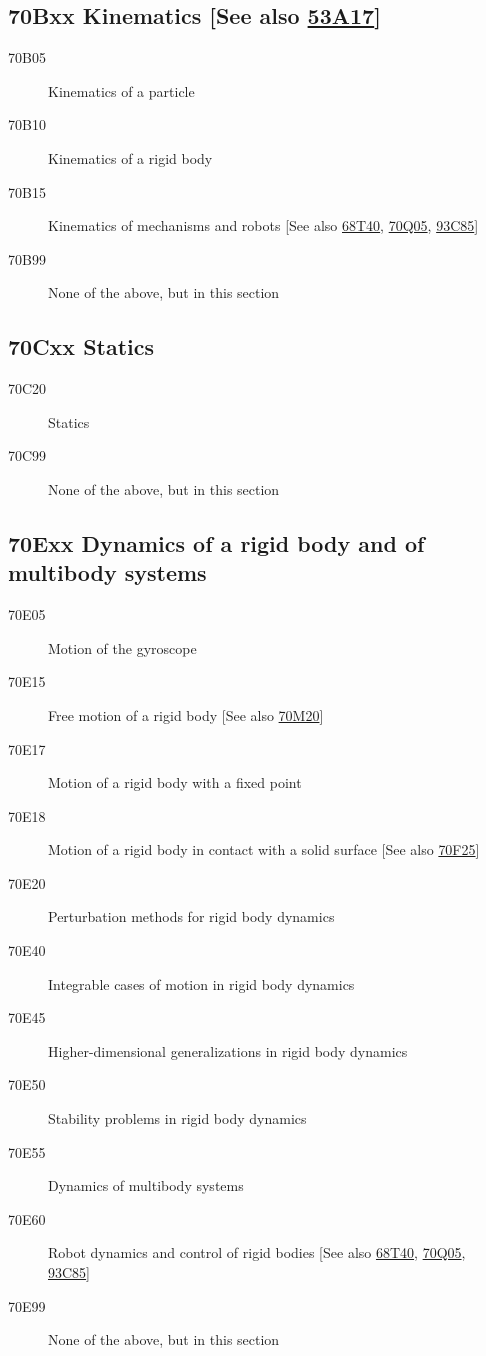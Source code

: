 \documentclass[letterpaper]{article}
\begin{document}
\subsection*{70Bxx  Kinematics [See also \hyperref[53A17]{53A17}] }\label{70Bxx}
\begin{description}  
\item [70B05]\label{70B05} Kinematics of a particle
\item [70B10]\label{70B10} Kinematics of a rigid body
\item [70B15]\label{70B15} Kinematics of mechanisms and robots [See also \hyperref[68T40]{68T40}, \hyperref[70Q05]{70Q05}, \hyperref[93C85]{93C85}]
\item [70B99]\label{70B99} None of the above, but in this section
\end{description}
\subsection*{70Cxx  Statics }\label{70Cxx}
\begin{description}  
\item [70C20]\label{70C20} Statics
\item [70C99]\label{70C99} None of the above, but in this section
\end{description}
\subsection*{70Exx  Dynamics of a rigid body and of multibody systems }\label{70Exx}
\begin{description}  
\item [70E05]\label{70E05} Motion of the gyroscope
\item [70E15]\label{70E15} Free motion of a rigid body [See also \hyperref[70M20]{70M20}]
\item [70E17]\label{70E17} Motion of a rigid body with a fixed point
\item [70E18]\label{70E18} Motion of a rigid body in contact with a solid surface [See also \hyperref[70F25]{70F25}]
\item [70E20]\label{70E20} Perturbation methods for rigid body dynamics
\item [70E40]\label{70E40} Integrable cases of motion in rigid body dynamics
\item [70E45]\label{70E45} Higher-dimensional generalizations in rigid body dynamics
\item [70E50]\label{70E50} Stability problems in rigid body dynamics
\item [70E55]\label{70E55} Dynamics of multibody systems
\item [70E60]\label{70E60} Robot dynamics and control of rigid bodies [See also \hyperref[68T40]{68T40}, \hyperref[70Q05]{70Q05}, \hyperref[93C85]{93C85}]
\item [70E99]\label{70E99} None of the above, but in this section
\end{description}
\end{document}
